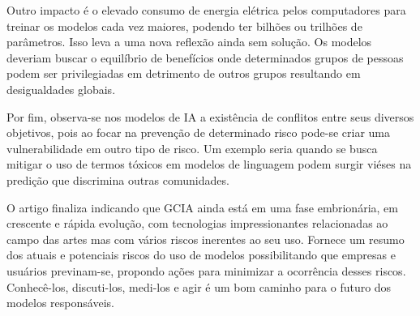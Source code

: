Outro impacto é o elevado consumo de energia elétrica pelos computadores para treinar os modelos 
cada vez maiores, podendo ter bilhões ou trilhões de parâmetros. Isso leva a uma nova reflexão ainda sem solução. 
Os modelos deveriam buscar o equilíbrio de benefícios onde determinados grupos de 
pessoas podem ser privilegiadas em detrimento de outros grupos resultando em desigualdades globais.


Por fim, observa-se nos modelos de IA a existência de conflitos entre seus diversos objetivos, pois ao focar na prevenção 
de determinado risco pode-se criar uma vulnerabilidade em outro tipo de risco. Um exemplo seria quando se busca mitigar 
o uso de termos tóxicos em modelos de linguagem podem surgir viéses na predição que discrimina outras 
comunidades.

O artigo finaliza indicando que GCIA ainda está em uma fase embrionária, em crescente e rápida evolução, 
com tecnologias impressionantes relacionadas ao campo das artes mas com vários riscos inerentes ao seu uso. 
Fornece um resumo dos atuais e potenciais riscos do uso de modelos possibilitando que empresas
e usuários previnam-se, propondo ações para minimizar a ocorrência desses riscos.
Conhecê-los, discuti-los, medi-los e agir é um bom caminho para o futuro dos modelos responsáveis.
